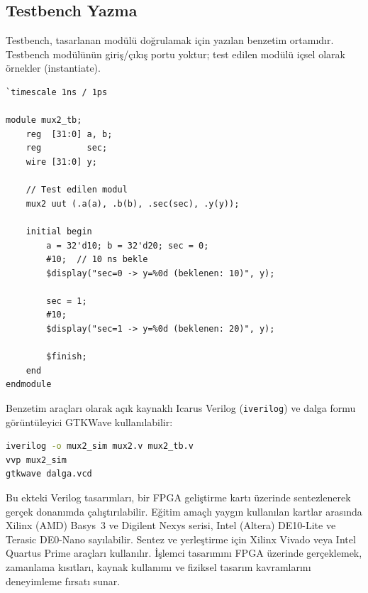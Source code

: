 \subsection{Testbench Yazma}
\label{sec:ekd-testbench}

Testbench, tasarlanan modülü doğrulamak için yazılan benzetim ortamıdır. Testbench modülünün giriş/çıkış portu yoktur; test edilen modülü içsel olarak örnekler (instantiate).

\begin{lstlisting}[style=verilog, caption={2'ye 1 çoklayıcı testbench örneği}, label={lst:ekd-testbench}]
`timescale 1ns / 1ps

module mux2_tb;
    reg  [31:0] a, b;
    reg         sec;
    wire [31:0] y;

    // Test edilen modul
    mux2 uut (.a(a), .b(b), .sec(sec), .y(y));

    initial begin
        a = 32'd10; b = 32'd20; sec = 0;
        #10;  // 10 ns bekle
        $display("sec=0 -> y=%0d (beklenen: 10)", y);

        sec = 1;
        #10;
        $display("sec=1 -> y=%0d (beklenen: 20)", y);

        $finish;
    end
endmodule
\end{lstlisting}

Benzetim araçları olarak açık kaynaklı Icarus Verilog (\texttt{iverilog}) ve dalga formu görüntüleyici GTKWave kullanılabilir:

\begin{lstlisting}[language=bash, numbers=none, caption={Icarus Verilog ile benzetim}]
iverilog -o mux2_sim mux2.v mux2_tb.v
vvp mux2_sim
gtkwave dalga.vcd
\end{lstlisting}

\begin{bilginot}
Bu ekteki Verilog tasarımları, bir FPGA geliştirme kartı üzerinde sentezlenerek gerçek donanımda çalıştırılabilir. Eğitim amaçlı yaygın kullanılan kartlar arasında Xilinx (AMD) Basys~3 ve Digilent Nexys serisi, Intel (Altera) DE10-Lite ve Terasic DE0-Nano sayılabilir. Sentez ve yerleştirme için Xilinx Vivado veya Intel Quartus Prime araçları kullanılır. İşlemci tasarımını FPGA üzerinde gerçeklemek, zamanlama kısıtları, kaynak kullanımı ve fiziksel tasarım kavramlarını deneyimleme fırsatı sunar.
\end{bilginot}


